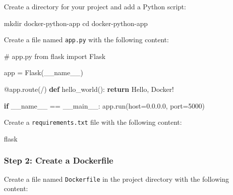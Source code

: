 \documentclass[
  letterpaper,
  DIV=11,
  numbers=noendperiod]{scrreprt}
\newenvironment{Shaded}{\begin{snugshade}}{\end{snugshade}}
\newcommand{\AttributeTok}[1]{\textcolor[rgb]{0.40,0.45,0.13}{#1}}
\newcommand{\BuiltInTok}[1]{\textcolor[rgb]{0.00,0.23,0.31}{#1}}
\newcommand{\CommentTok}[1]{\textcolor[rgb]{0.37,0.37,0.37}{#1}}
\newcommand{\ControlFlowTok}[1]{\textcolor[rgb]{0.00,0.23,0.31}{\textbf{#1}}}
\newcommand{\DecValTok}[1]{\textcolor[rgb]{0.68,0.00,0.00}{#1}}
\newcommand{\FunctionTok}[1]{\textcolor[rgb]{0.28,0.35,0.67}{#1}}
\newcommand{\ImportTok}[1]{\textcolor[rgb]{0.00,0.46,0.62}{#1}}
\newcommand{\KeywordTok}[1]{\textcolor[rgb]{0.00,0.23,0.31}{\textbf{#1}}}
\newcommand{\NormalTok}[1]{\textcolor[rgb]{0.00,0.23,0.31}{#1}}
\newcommand{\OperatorTok}[1]{\textcolor[rgb]{0.37,0.37,0.37}{#1}}
\newcommand{\StringTok}[1]{\textcolor[rgb]{0.13,0.47,0.30}{#1}}
\newcommand{\VariableTok}[1]{\textcolor[rgb]{0.07,0.07,0.07}{#1}}
\begin{document}
Create a directory for your project and add a Python script:

\begin{Shaded}
\begin{Highlighting}[]
\FunctionTok{mkdir}\NormalTok{ docker{-}python{-}app}
\BuiltInTok{cd}\NormalTok{ docker{-}python{-}app}
\end{Highlighting}
\end{Shaded}

Create a file named \texttt{app.py} with the following content:

\begin{Shaded}
\begin{Highlighting}[]
\CommentTok{\# app.py}
\ImportTok{from}\NormalTok{ flask }\ImportTok{import}\NormalTok{ Flask}

\NormalTok{app }\OperatorTok{=}\NormalTok{ Flask(}\VariableTok{\_\_name\_\_}\NormalTok{)}

\AttributeTok{@app.route}\NormalTok{(}\StringTok{\textquotesingle{}/\textquotesingle{}}\NormalTok{)}
\KeywordTok{def}\NormalTok{ hello\_world():}
    \ControlFlowTok{return} \StringTok{\textquotesingle{}Hello, Docker!\textquotesingle{}}

\ControlFlowTok{if} \VariableTok{\_\_name\_\_} \OperatorTok{==} \StringTok{\textquotesingle{}\_\_main\_\_\textquotesingle{}}\NormalTok{:}
\NormalTok{    app.run(host}\OperatorTok{=}\StringTok{\textquotesingle{}0.0.0.0\textquotesingle{}}\NormalTok{, port}\OperatorTok{=}\DecValTok{5000}\NormalTok{)}
\end{Highlighting}
\end{Shaded}

Create a \texttt{requirements.txt} file with the following content:

\begin{Shaded}
\begin{Highlighting}[]
\NormalTok{flask}
\end{Highlighting}
\end{Shaded}

\subsubsection{Step 2: Create a
Dockerfile}\label{step-2-create-a-dockerfile-1}

Create a file named \texttt{Dockerfile} in the project directory with
the following content:
\end{document}
